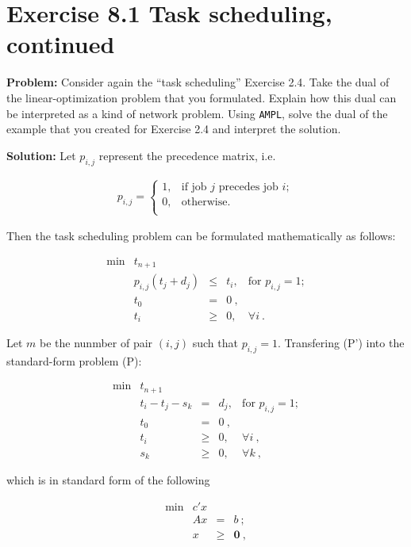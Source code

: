 \section{Exercise 8.1 Task scheduling, continued}
\textbf{Problem:} Consider again the ``task scheduling'' Exercise 2.4. Take the dual of the linear-optimization problem that you formulated. Explain how this dual can be interpreted as a kind of network problem. Using {\tt AMPL}, solve the dual of the example that you created for Exercise 2.4 and interpret the solution.

\textbf{Solution:} Let $p_{i,j}$ represent the precedence matrix, i.e.

\begin{eqnarray}
p_{i,j} =
\begin{cases}
1,   & \text{if job $j$ precedes job $i$}; \\
0,   & \text{otherwise}. \\
\end{cases}
\end{eqnarray}

Then the task scheduling problem can be formulated mathematically as follows:

\[
\tag{P'}
\begin{array}{rrcll}
 \min & t_{n+1}  &  &   & \\
      &  p_{i,j}(t_j + d_j)  &   \leq  & t_i, & \text{for~} p_{i,j} =1; \\
      &  t_0 & = & 0~, & \\
      &  t_i & \geq & 0, & \forall i~.
\end{array}
\]

Let $m$ be the nunmber of pair $(i,j)$ such that $p_{i,j} =1$. Transfering (P') into the standard-form problem (P):

\[
\tag{P}
\begin{array}{rrcll}
 \min & t_{n+1}  &  &   & \\
      &  t_i - t_j - s_k   &   =  & d_j, & \text{for~} p_{i,j} =1; \\
      &  t_0 & = & 0~, & \\
      &  t_i & \geq & 0, & \forall i~, \\
	 &  s_k & \geq & 0, & \forall k~,
\end{array}
\]

which is in standard form of the following

\[
\tag{P}
\begin{array}{rrcl}
 \min & c'x  &      &   \\
      &  Ax  &   =  & b~; \\
      &   x  & \geq & \mathbf{0}~,
\end{array}
\]

